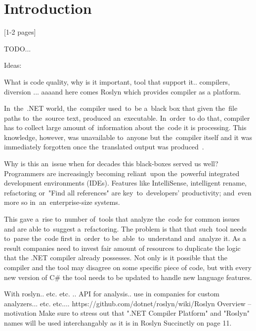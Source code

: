 \documentclass[
  digital, %
  table,   %
  lof,     %
  lot,     %
  oneside,
]{fithesis3}
\begin{document}
  \chapter{Introduction}
  [1-2 pages]
  
TODO...

Ideas:

What is code quality, why is it important, tool that support it.. compilers, diversion ... aaaand here comes Roslyn which provides compiler as a platform.  

In~the~.NET world, the~compiler used~to~be a~black box that given the~file paths to~the~source text, produced an~executable. In~order~to do that, compiler has to collect large amount of~information about the~code it is processing. This knowledge, however, was unavailable to~anyone but the~compiler itself and it was immediately forgotten once the~translated output was produced~\cite{roslyn-overview-github}. 

Why is this an~issue when for decades this black-boxes served us well? Programmers are increasingly becoming reliant~upon the~powerful integrated development environments (IDEs). Features like IntelliSense, intelligent rename, refactoring or~"Find all references" are key~to~developers' productivity; and~even more so in~an~enterprise-size systems. 

This gave a~rise to~number of~tools that analyze the~code for common issues and are able to~suggest a~refactoring. The problem is that that such~tool needs to~parse the~code first in~order~to be~able~to~understand and~analyze it. As a result companies need to invest fair amount of resources to duplicate the logic that the .NET compiler already possesses. Not only is it possible that the compiler and the tool may disagree on some specific piece of code, but with every new version of C\# the tool needs to be updated to handle new language features\cite{dot-net-development-using-the-compiler-api}.

With roslyn.. etc. etc. .. API for analysis.. use in companies for custom analyzers... etc. etc....
 https://github.com/dotnet/roslyn/wiki/Roslyn Overview -- motivation
Make sure to stress out that ".NET Compiler Platform" and "Roslyn" names will be used interchangably as it is in Roslyn Succinctly on page 11.


\end{document}
